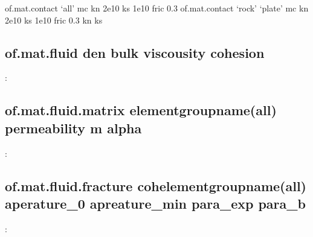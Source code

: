 \documentclass[letterpaper,10pt,english]{sphinxmanual}
\begin{document}
\begin{sphinxVerbatim}[commandchars=\\\{\}]
of.mat.contact ‘all’ mc kn 2e10 ks 1e10 fric 0.3
of.mat.contact ‘rock’ ‘plate’ mc kn 2e10 ks 1e10 fric 0.3 kn ks
\end{sphinxVerbatim}


\subsection{of.mat.fluid den bulk viscousity cohesion}
\label{\detokenize{rst_tutorials/command_line_guide:of-mat-fluid-den-bulk-viscousity-cohesion}}
:

\begin{sphinxVerbatim}[commandchars=\\\{\}]
        
\end{sphinxVerbatim}


\subsection{of.mat.fluid.matrix elementgroupname(all) permeability m alpha}
\label{\detokenize{rst_tutorials/command_line_guide:of-mat-fluid-matrix-elementgroupname-all-permeability-m-alpha}}
:

\begin{sphinxVerbatim}[commandchars=\\\{\}]
       
\end{sphinxVerbatim}


\subsection{of.mat.fluid.fracture cohelementgroupname(all) aperature\_0 apreature\_min para\_exp para\_b}
\label{\detokenize{rst_tutorials/command_line_guide:of-mat-fluid-fracture-cohelementgroupname-all-aperature-0-apreature-min-para-exp-para-b}}
:

\begin{sphinxVerbatim}[commandchars=\\\{\}]
       
\end{sphinxVerbatim}
\end{document}
